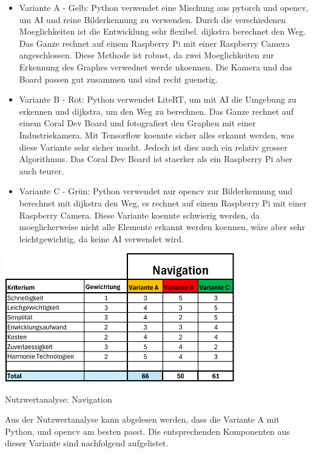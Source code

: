 \begin{itemize}
     \item Variante A - Gelb: Python verwendet eine Mischung aus \gls{pytorch} und \gls{opencv}, um AI und reine Bilderkennung zu verwenden. Durch die verschiedenen Moeglichkeiten ist die Entwicklung sehr flexibel. \gls{dijkstra} berechnet den Weg. Das Ganze rechnet auf einem Raspberry Pi mit einer Raspberry Camera angeschlossen. Diese Methode ist robust, da zwei Moeglichkeiten zur Erkennung des Graphes verwednet werde nkoennen. Die Kamera und das Board passen gut zusammen und sind recht guenstig. 
    \item  Variante B - Rot: Python verwendet LiteRT, um mit AI die Umgebung zu erkennen und \gls{dijkstra}, um den Weg zu berechnen. Das Ganze rechnet auf einem Coral Dev Board und fotografiert den Graphen mit einer Industriekamera. Mit Tensorflow koennte sicher alles erkannt werden, was diese Variante sehr sicher macht. Jedoch ist dies auch ein relativ grosser Algorithmus. Das Coral Dev Board ist staerker als ein Raspberry Pi aber auch teurer.
    \item Variante C - Grün: Python verwendet nur \gls{opencv} zur Bilderkennung und berechnet mit \gls{dijkstra} den Weg, es rechnet auf einem Raspberry Pi mit einer Raspberry Camera. Diese Variante koennte schwierig werden, da moeglicherweise nicht alle Elemente erkannt werden koennen, wäre aber sehr leichtgewichtig, da keine AI verwendet wird.
\end{itemize}


\begin{table}[H]
\centering
\includegraphics[width=0.75\textwidth]{assets/Nutzwertanalyse-I.pdf}
\caption{Nutzwertanalyse: Navigation}
\label{table:nutzwert-informatik}
\end{table}

Aus der Nutzwertanalyse kann abgelesen werden, dass die Variante A mit Python,  und \gls{opencv} am besten passt. Die entsprechenden Komponenten aus dieser Variante sind nachfolgend aufgelistet.

